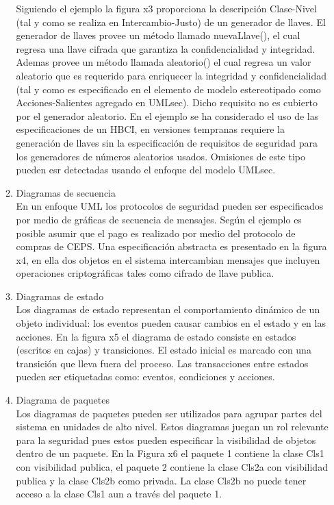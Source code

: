 \documentclass[runningheads,a4paper]{llncs}
\begin{document}
\begin{enumerate}
\begin{enumerate}
Siguiendo el ejemplo la figura x3 proporciona la descripción Clase-Nivel (tal y como se realiza en Intercambio-Justo) de un generador de llaves. El generador de llaves provee un método llamado nuevaLlave(), el cual regresa una llave cifrada que garantiza la confidencialidad y integridad. Ademas provee un método llamada aleatorio() el cual regresa un valor aleatorio que es requerido para enriquecer la integridad y confidencialidad (tal y como es especificado en el elemento de modelo estereotipado como Acciones-Salientes agregado en \gls{UMLsec}). Dicho requisito no es cubierto por el generador aleatorio. En el ejemplo se ha considerado el uso de las especificaciones de un \gls{HBCI}, en versiones tempranas requiere la generación de llaves sin la especificación de requisitos de seguridad para los generadores de números aleatorios usados. Omisiones de este tipo pueden esr detectadas usando el enfoque del modelo \gls{UMLsec}.\\

			\item Diagramas de secuencia\\

En un enfoque \gls{UML} los protocolos de seguridad pueden ser especificados por medio de gráficas de secuencia de mensajes. Según el ejemplo es posible asumir que el pago es realizado por medio del protocolo de compras de \gls{CEPS}. Una especificación abstracta es presentado en la figura x4, en ella dos objetos en el sistema intercambian mensajes que incluyen operaciones criptográficas tales como cifrado de llave publica.\\ 
			
			\item Diagramas de estado\\

Los diagramas de estado representan el comportamiento dinámico de un objeto individual: los eventos pueden causar cambios en el estado y en las acciones.	En la figura x5 el diagrama de estado consiste en estados (escritos en cajas) y transiciones.  El estado inicial es marcado con una transición que lleva fuera del proceso. Las transacciones entre estados pueden ser etiquetadas como: eventos, condiciones y acciones.\\ 

			\item Diagrama de paquetes\\

Los diagramas de paquetes pueden ser utilizados para agrupar partes del sistema en unidades de alto nivel. Estos diagramas juegan un rol relevante para la seguridad pues estos pueden especificar la visibilidad de objetos dentro de un paquete. En la Figura x6 el paquete 1 contiene la clase Cls1 con visibilidad publica, el paquete 2 contiene la clase Cls2a con visibilidad publica y la clase Cls2b como privada. La clase Cls2b no puede tener acceso a la clase Cls1 aun a través del paquete 1.\\


\end{enumerate}
\end{enumerate}
\end{document}
